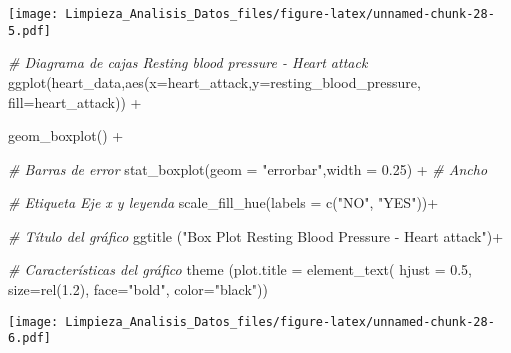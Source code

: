 \documentclass[
]{article}
\newenvironment{Shaded}{\begin{snugshade}}{\end{snugshade}}
\newcommand{\AttributeTok}[1]{\textcolor[rgb]{0.77,0.63,0.00}{#1}}
\newcommand{\CommentTok}[1]{\textcolor[rgb]{0.56,0.35,0.01}{\textit{#1}}}
\newcommand{\FloatTok}[1]{\textcolor[rgb]{0.00,0.00,0.81}{#1}}
\newcommand{\FunctionTok}[1]{\textcolor[rgb]{0.00,0.00,0.00}{#1}}
\newcommand{\NormalTok}[1]{#1}
\newcommand{\SpecialCharTok}[1]{\textcolor[rgb]{0.00,0.00,0.00}{#1}}
\newcommand{\StringTok}[1]{\textcolor[rgb]{0.31,0.60,0.02}{#1}}
\begin{document}
\texttt{[image: Limpieza\_Analisis\_Datos\_files/figure-latex/unnamed-chunk-28-5.pdf]}

\begin{Shaded}
\begin{Highlighting}[]
\CommentTok{\# Diagrama de cajas Resting blood pressure {-} Heart attack}
\FunctionTok{ggplot}\NormalTok{(heart\_data,}\FunctionTok{aes}\NormalTok{(}\AttributeTok{x=}\NormalTok{heart\_attack,}\AttributeTok{y=}\NormalTok{resting\_blood\_pressure, }\AttributeTok{fill=}\NormalTok{heart\_attack)) }\SpecialCharTok{+}
  

  \FunctionTok{geom\_boxplot}\NormalTok{() }\SpecialCharTok{+}
  
  \CommentTok{\# Barras de error}
  \FunctionTok{stat\_boxplot}\NormalTok{(}\AttributeTok{geom =} \StringTok{"errorbar"}\NormalTok{,}\AttributeTok{width =} \FloatTok{0.25}\NormalTok{) }\SpecialCharTok{+} \CommentTok{\# Ancho}
  
  \CommentTok{\# Etiqueta Eje x y leyenda}
  \FunctionTok{scale\_fill\_hue}\NormalTok{(}\AttributeTok{labels =} \FunctionTok{c}\NormalTok{(}\StringTok{"NO"}\NormalTok{, }\StringTok{"YES"}\NormalTok{))}\SpecialCharTok{+}
  
  \CommentTok{\# Título del gráfico}
  \FunctionTok{ggtitle}\NormalTok{ (}\StringTok{"Box Plot Resting Blood Pressure {-} Heart attack"}\NormalTok{)}\SpecialCharTok{+}
   
  \CommentTok{\# Características del gráfico}
    \FunctionTok{theme}\NormalTok{ (}\AttributeTok{plot.title =} \FunctionTok{element\_text}\NormalTok{(}
        \AttributeTok{hjust =} \FloatTok{0.5}\NormalTok{,}
        \AttributeTok{size=}\FunctionTok{rel}\NormalTok{(}\FloatTok{1.2}\NormalTok{),}
        \AttributeTok{face=}\StringTok{"bold"}\NormalTok{, }
        \AttributeTok{color=}\StringTok{"black"}\NormalTok{))}
\end{Highlighting}
\end{Shaded}

\texttt{[image: Limpieza\_Analisis\_Datos\_files/figure-latex/unnamed-chunk-28-6.pdf]}
\end{document}

